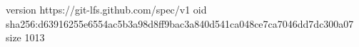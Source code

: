 version https://git-lfs.github.com/spec/v1
oid sha256:d63916255e6554ac5b3a98d8ff9bac3a840d541ca048ce7ca7046dd7dc300a07
size 1013
